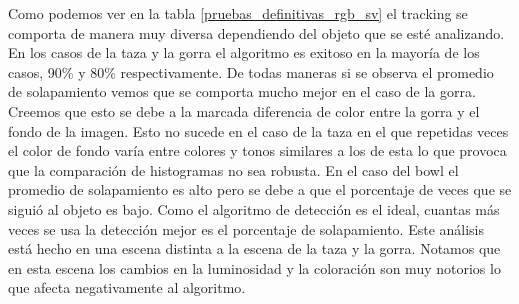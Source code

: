 Como podemos ver en la tabla \ref{pruebas_definitivas_rgb_sv} el tracking se comporta de manera muy diversa dependiendo del objeto que se esté analizando. En los casos de la taza y la gorra el algoritmo es exitoso en la mayoría de los casos, 90\% y 80\% respectivamente. De todas maneras si se observa el promedio de solapamiento vemos que se comporta mucho mejor en el caso de la gorra. Creemos que esto se debe a la marcada diferencia de color entre la gorra y el fondo de la imagen. Esto no sucede en el caso de la taza en el que repetidas veces el color de fondo varía entre colores y tonos similares a los de esta lo que provoca que la comparación de histogramas no sea robusta. En el caso del bowl el promedio de solapamiento es alto pero se debe a que el porcentaje de veces que se siguió al objeto es bajo. Como el algoritmo de detección es el ideal, cuantas más veces se usa la detección mejor es el porcentaje de solapamiento. Este análisis está hecho en una escena distinta a la escena de la taza y la gorra. Notamos que en esta escena los cambios en la luminosidad y la coloración son muy notorios lo que afecta negativamente al algoritmo.


